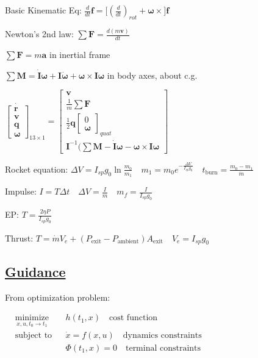 \documentclass[11pt,landscape]{article}
\begin{document}
\everymath{\displaystyle}

Basic Kinematic Eq:
$\frac{d}{dt} \bm f = \big[ (\frac{d}{dt})_{rot} + \bm\omega \times \big] \bm f$

Newton's 2nd law:
$\sum \bm F = \frac{d(m \bm v)}{dt}$

$\sum \bm F = m \bm a$ \quad in inertial frame

$\sum \bm M = 
\dot{\bm I} \bm\omega + \bm I \dot{\bm\omega} + \bm\omega \times \bm I \bm\omega$
\quad in body axes, about c.g.

$
\dot{
\begin{bmatrix} \bm r \\ \bm v \\ \bm q \\ \bm \omega \end{bmatrix}}_{13\times1}
=
\begin{bmatrix} \bm v \\ \frac{1}{m} \sum \bm F 
\\ \frac{1}{2} \bm q \begin{bmatrix} 0 \\ \bm\omega \end{bmatrix}_{quat}
\\ \bm I^{-1}(\sum \bm M - \dot{\bm I} \bm\omega - \bm\omega \times \bm I \bm\omega 
\end{bmatrix}
$

Rocket equation:
$\Delta V = I_{sp} g_0 \ln\frac{m_0}{m_1}
\quad
m_1 = m_0 e^{-\frac{\Delta V}{I_{sp}g_0}}
\quad
t_{\text{burn}}=\frac{m_0-m_1}{\dot{m}}$

Impulse:
$I = T \Delta t
\quad
\Delta V = \frac{I}{m}
\quad
m_f = \frac{I}{I_{sp}g_0}
$

EP:
$T = \frac{2\eta P}{I_{sp}g_0}$

Thrust:
$T = \dot{m}V_e + (P_{\text{exit}} - P_{\text{ambient}})A_{\text{exit}}
\quad
V_e = I_{sp} g_0
$


\newpage
\subsection{\underline{Guidance}}

From optimization problem:

$
\begin{aligned}
& \underset{x, u, t_0 \rightarrow t_1}{\text{minimize}}
& & h(t_1, x) \quad \text{cost function} \\
& \text{subject to}
& & \dot{x} = f(x, u) \quad \text{dynamics constraints} \\
&&& \Phi(t_1, x) = 0 \quad \text{terminal constraints}
\end{aligned}
$
\end{document}
